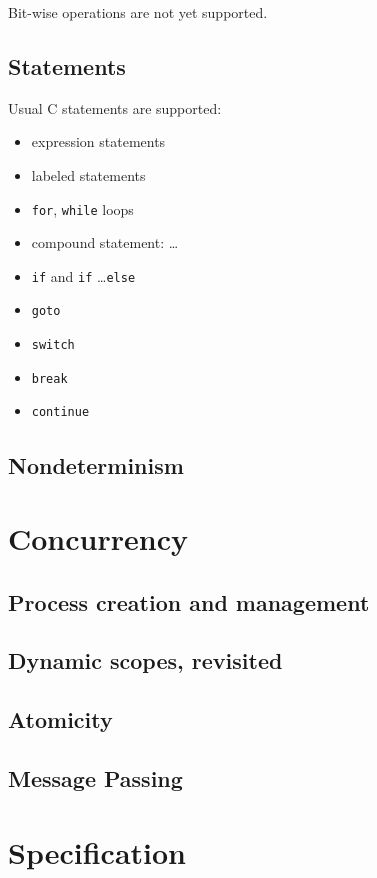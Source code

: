 Bit-wise operations are not yet supported.

\section{Statements}

Usual C statements are supported:
\begin{itemize}
\item expression statements
\item labeled statements
\item \texttt{for}, \texttt{while} loops
\item compound statement: \lb \ldots \rb
\item \texttt{if} and \verb!if! \ldots \verb!else!
\item \verb!goto!
\item \verb!switch!
\item \verb!break!
\item \verb!continue!
\end{itemize}

\section{Nondeterminism}

\cchoose



\chapter{Concurrency}

\section{Process creation and management}

\section{Dynamic scopes, revisited}

\section{Atomicity}

\section{Message Passing}

\chapter{Specification}

